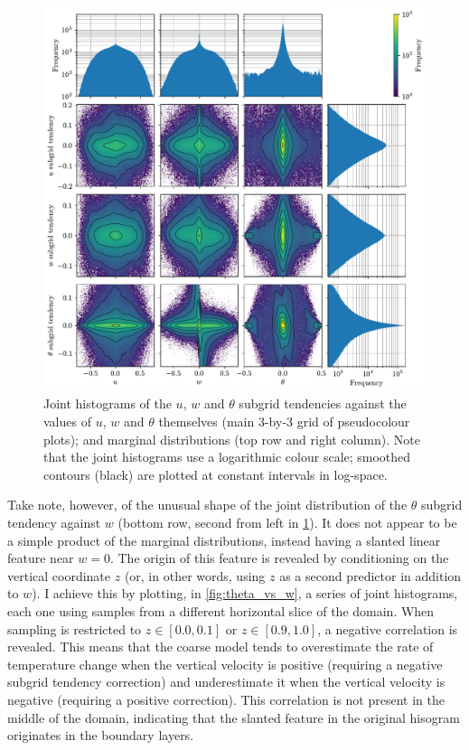 \documentclass[../main.tex]{subfiles}
\begin{document}
\begin{figure}[ht]
    \centering
    \includegraphics[width=\linewidth]{figures/subgrid_vs_vars.pdf}
    \caption{
        Joint histograms of the $u$, $w$ and $\theta$ subgrid tendencies
        against the values of $u$, $w$ and $\theta$ themselves (main 3-by-3
        grid of pseudocolour plots); and marginal distributions (top row and
        right column). Note that the joint histograms use a logarithmic
        colour scale; smoothed contours (black) are plotted at constant
        intervals in log-space.
    }
    \label{fig:subgrid_vs_vars}
\end{figure}

Take note, however, of the unusual shape of the joint distribution of the
$\theta$ subgrid tendency against $w$ (bottom row, second from left in
\cref{fig:subgrid_vs_vars}). It does not appear to be a simple product of the
marginal distributions, instead having a slanted linear feature near $w=0$. The
origin of this feature is revealed by conditioning on the vertical coordinate
$z$ (or, in other words, using $z$ as a second predictor in addition to $w$). I
achieve this by plotting, in \cref{fig:theta_vs_w}, a series of joint
histograms, each one using samples from a different horizontal slice of the
domain. When sampling is restricted to $z \in [0.0, 0.1]$ or $z \in [0.9,
1.0]$, a negative correlation is revealed. This means that the coarse model
tends to overestimate the rate of temperature change when the vertical velocity
is positive (requiring a negative subgrid tendency correction) and
underestimate it when the vertical velocity is negative (requiring a positive
correction). This correlation is not present in the middle of the domain,
indicating that the slanted feature in the original hisogram originates in the
boundary layers.
\end{document}
